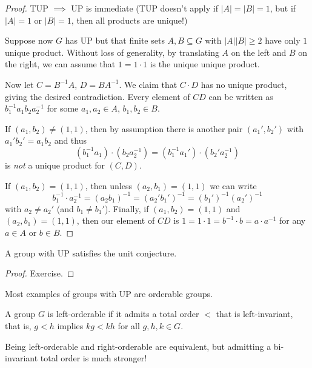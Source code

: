 \begin{proof}
    TUP $\implies$ UP is immediate (TUP doesn't apply if $|A| = |B| = 1$, but if $|A| = 1$ or $|B| = 1$, then all products are unique!)

    Suppose now $G$ has UP but that finite sets $A, B \subseteq G$ with $|A| |B| \geq 2$ have only $1$ unique product.
    Without loss of generality, by translating $A$ on the left and $B$ on the right, we can assume that $1 = 1 \cdot 1$ is the unique unique product.

    Now let $C = B^{-1} A$, $D = B A^{-1}$.
    We claim that $C \cdot D$ has no unique product, giving the desired contradiction.
    Every element of $CD$ can be written as $b_1^{-1} a_1 b_2 a_2^{-1}$ for some $a_1, a_2 \in A$, $b_1, b_2 \in B$.

    If $(a_1, b_2) \neq (1, 1)$, then by assumption there is another pair $(a_1', b_2')$ with $a_1' b_2' = a_1 b_2$ and thus \[
        (b_1^{-1} a_1) \cdot (b_2 a_2^{-1}) = (b_1^{-1} a_1') \cdot (b_2' a_2^{-1})
    \] is \emph{not} a unique product for $(C, D)$.

    If $(a_1, b_2) = (1, 1)$, then unless $(a_2, b_1) = (1, 1)$ we can write \[
        b_1^{-1} \cdot a_2^{-1} = (a_2 b_1)^{-1} = (a_2' b_1')^{-1} = (b_1')^{-1} (a_2')^{-1}
    \]
    with $a_2 \neq a_2'$ (and $b_1 \neq b_1'$).
    Finally, if $(a_1, b_2) = (1, 1)$ and $(a_2, b_1) = (1, 1)$, then our element of $CD$ is $1 = 1 \cdot 1 = b^{-1} \cdot b = a \cdot a^{-1}$ for any $a \in A$ or $b \in B$.
\end{proof}

\begin{corollary}
    A group with UP satisfies the unit conjecture.
\end{corollary}

\begin{proof}
    Exercise.
\end{proof}

Most examples of groups with UP are orderable groups.

\begin{definition}
    A group $G$ is left-orderable if it admits a total order $<$ that is left-invariant, that is, $g < h$ implies $kg < kh$ for all $g, h, k \in G$.
\end{definition}

\begin{remark}
    Being left-orderable and right-orderable are equivalent, but admitting a bi-invariant total order is much stronger!
\end{remark}


